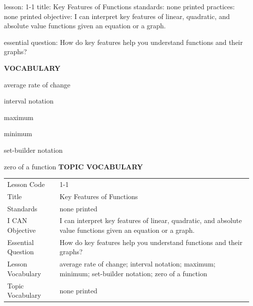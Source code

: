\documentclass{article}
\newenvironment{lesson-meta}{}{}        %
\newcommand{\te}[1]{}                   %
\begin{document}
\begin{lesson-meta}
lesson: 1-1
title: Key Features of Functions
standards: none printed
practices: none printed
objective: I can interpret key features of linear, quadratic, and absolute value functions given an equation or a graph.

essential question: How do key features help you understand functions and their graphs?

\textbf{VOCABULARY}
\item average rate of change
\item interval notation
\item maximum
\item minimum
\item set-builder notation
\item zero of a function
\textbf{TOPIC VOCABULARY}
\te{No topic vocabulary list is printed on these lesson pages. The I CAN statement is on PDF page 13; the Essential Question is on PDF page 14. No numbered content-standard or Mathematical Practice codes are printed on the overview or student-page header.}
\begin{tabular}{ll}
Lesson Code & 1-1 \\
Title & Key Features of Functions \\
Standards & none printed \\
I CAN Objective & I can interpret key features of linear, quadratic, and absolute value functions given an equation or a graph. \\
Essential Question & How do key features help you understand functions and their graphs? \\
Lesson Vocabulary & average rate of change; interval notation; maximum; minimum; set-builder notation; zero of a function \\
Topic Vocabulary & none printed \\
\end{tabular}
\end{lesson-meta}
\end{document}
